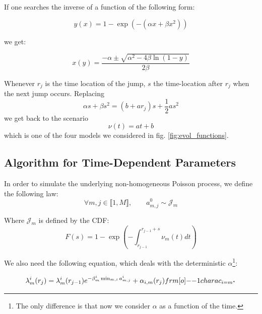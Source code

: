 \documentclass[11pt]{book}
\begin{document}
\begin{ajoutationV}{}{}
If one searches the inverse of a function of the following form:

$$ y(x) = 1 - \exp ( - (\alpha x + \beta x^2) ) $$

we get:

$$ x(y) = \frac{- \alpha \pm \sqrt{\alpha^2 - 4 \beta \ln(1-y) }  }{2 \beta}$$

Whenever $r_j$ is the time location of the jump, $s$ the time-location after $r_j$ when the next jump occurs. Replacing $$\alpha s + \beta s^2 = ( b + a r_j ) s + \frac 1 2 a s^2 $$ 
we get back to the scenario $$ \nu(t) =  a t + b $$ which is one of the four models we considered in fig. \ref{fig:evol_functions}.
\end{ajoutationV}


\subsection{Algorithm for Time-Dependent Parameters}

In order to simulate the underlying non-homogeneous Poisson process, we define the following law:
$$ \forall m,j \in  \llbracket 1, M \rrbracket, \qquad a_{m,j}^0 \sim \mathcal J_m  $$

Where $\mathcal J_m $ is defined by the CDF:
\begin{equation}
\label{eq:J_defined}
F(s) = 1 - \exp \left ( - \int_{r_{j-1}}^{r_{j-1} + s } \nu_m (t) dt \right )
\end{equation}

We also need the following equation, which deals with the deterministic $\alpha$\footnote{The only difference is that now we consider $\alpha$ as a function of the time.}:

\begin{equation}
\lambda_m^i ( r_j ) = \lambda_m^i ( r_{j-1} )  e^{ - \beta_m^i \min_{m,i} a_{m,j}^i } + \alpha_{i,m} (r_j) \11charac_{i = m^*}
\label{eq:update_lambda_time} 
\end{equation}
\end{document}
